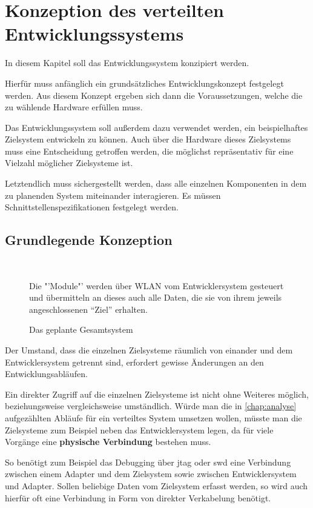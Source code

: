 \chapter{Konzeption des verteilten Entwicklungssystems}\label{chap:konzeption}
\minitoc
In diesem Kapitel soll das Entwicklungssystem konzipiert werden.

Hierfür muss anfänglich ein grundsätzliches Entwicklungskonzept festgelegt
werden. Aus diesem Konzept ergeben sich dann die Voraussetzungen, welche die zu
wählende Hardware erfüllen muss.

Das Entwicklungssystem soll außerdem dazu verwendet werden, ein
beispielhaftes Zielsystem entwickeln zu können. Auch über die Hardware dieses
Zielsystems muss eine Entscheidung getroffen werden, die möglichst
repräsentativ für eine Vielzahl möglicher Zielsysteme ist.

Letztendlich muss sichergestellt werden, dass alle einzelnen Komponenten in dem
zu planenden System miteinander interagieren. Es müssen
Schnittstellenspezifikationen festgelegt werden.
\section{Grundlegende Konzeption}
\begin{figure}[!ht]
\centering
\def\svgwidth{0.88\columnwidth}
\\
\caption{Das geplante Gesamtsystem}{Die "'Module"' werden über WLAN
vom Entwicklersystem gesteuert und übermitteln an dieses auch alle
Daten, die sie von ihrem jeweils angeschlossenen "`Ziel"' erhalten.}
\label{fig:sys}
\end{figure}
Der Umstand, dass die einzelnen Zielsysteme räumlich von einander und dem
Entwicklersystem getrennt sind, erfordert gewisse Änderungen an den
Entwicklungsabläufen.

Ein direkter Zugriff auf die einzelnen Zielsysteme ist nicht ohne Weiteres
möglich, beziehungsweise vergleichsweise umständlich. Würde man die in
\autoref{chap:analyse} aufgezählten Abläufe für ein verteiltes System umsetzen
wollen, müsste man die Zielsysteme zum Beispiel neben das Entwicklersystem
legen, da für viele Vorgänge eine \textbf{physische Verbindung} bestehen muss.

So benötigt zum Beispiel das Debugging über \gls{jtag} oder \gls{swd} eine
Verbindung zwischen einem Adapter und dem Zielsystem sowie zwischen
Entwicklersystem und Adapter. Sollen beliebige Daten vom Zielsystem erfasst
werden, so wird auch hierfür oft eine Verbindung in Form von direkter
Verkabelung benötigt.

